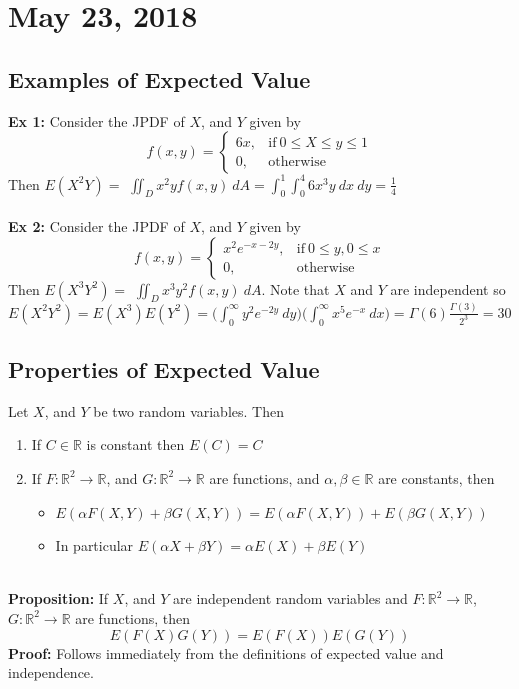 \documentclass{article}
\newcommand{\R}{\mathbb{R}}
\newcommand{\Ga}{\Gamma}
\newcommand{\al}{\alpha}
\newcommand{\be}{\beta}
\newcommand{\prop}{\textbf{Proposition: }}
\newcommand{\proo}{\textbf{Proof: }}
\newcommand{\exxi}{\textbf{Ex 1: }}
\newcommand{\exxii}{\textbf{Ex 2:  }}
\begin{document}

\section{May 23, 2018}
\subsection{Examples of Expected Value}
\exxi Consider the JPDF of $X$, and $Y$ given by
\[
f(x, y) =
\begin{cases}
	6x, &\text{if}\ 0 \leq X \leq y \leq 1\\
	0, &\text{otherwise}
\end{cases}
\]
Then $E(X^{2}Y) =$ $\displaystyle \iint_{D}x^{2}yf(x, y)\ dA = \int_{0}^{1} \int_{0}^{4} 6x^{3}y\ dx\ dy = \frac{1}{4}$\\\\
\exxii Consider the JPDF of $X$, and $Y$ given by
\[
f(x, y) =
\begin{cases}
	x^{2}e^{-x-2y}, &\text{if}\ 0 \leq y, 0 \leq x\\
	0, &\text{otherwise}
\end{cases}
\]
Then $E(X^{3}Y^{2}) =$ $\displaystyle \iint_{D}x^{3}y^{2}f(x, y)\ dA$. Note that $X$ and $Y$ are independent so $\displaystyle E(X^{2}Y^{2}) = E(X^{3})E(Y^{2}) = \bigg(\int_{0}^{\infty}y^{2}e^{-2y}\ dy\bigg)\bigg(\int_{0}^{\infty}x^{5}e^{-x}\ dx\bigg) = \Ga(6)\frac{\Ga(3)}{2^3} = 30$
\subsection{Properties of Expected Value}
Let $X$, and $Y$ be two random variables. Then
\begin{enumerate}
	\item If $C \in \R$ is constant then $E(C) = C$
	\item If $F : \R^{2} \to \R$, and $G : \R^{2} \to \R$ are functions, and $\al,\be \in \R$ are constants, then
		\begin{itemize}
			\item $E(\al F(X, Y) + \be G(X, Y)) = E(\al F(X, Y)) + E(\be G(X, Y))$
			\item In particular $E(\al X + \be Y) = \al E(X) + \be E(Y)$
		\end{itemize}
\end{enumerate}
\ \\
\prop If $X$, and $Y$ are independent random variables and $F : \R^{2} \to \R$, $G : \R^{2} \to \R$ are functions, then
\[E(F(X)G(Y)) = E(F(X))E(G(Y))\]
\proo Follows immediately from the definitions of expected value and independence.
\end{document}
